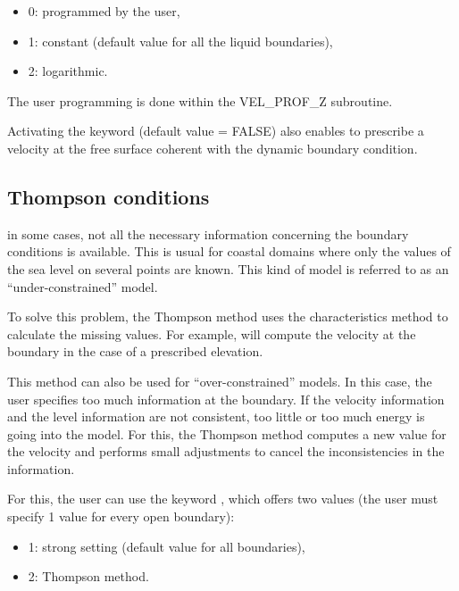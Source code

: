 \begin{itemize}
\item 0: programmed by the user,

\item 1: constant (default value for all the liquid boundaries),

\item 2: logarithmic.
\end{itemize}

The user programming is done within the VEL\_PROF\_Z subroutine.

Activating the keyword  (default value =
FALSE) also enables to prescribe a velocity at the free surface coherent with
the dynamic boundary condition.

\subsection{Thompson conditions}

in some cases, not all the necessary information concerning the boundary
conditions is available. This is usual for coastal domains where only the
values of the sea level on several points are known. This kind of model is
referred to as an ``under-constrained'' model.

To solve this problem, the Thompson method uses the characteristics method to
calculate the missing values. For example,  will compute the velocity
at the boundary in the case of a prescribed elevation.

This method can also be used for ``over-constrained'' models. In this case,
the user specifies too much information at the boundary. If the velocity
information and the level information are not consistent, too little or too
much energy is going into the model. For this, the Thompson method computes a
new value for the velocity and performs small adjustments to cancel the
inconsistencies in the information.

For this, the user can use the keyword ,
which offers two values (the user must specify 1 value for every open
boundary):

\begin{itemize}
\item 1: strong setting (default value for all boundaries),

\item 2: Thompson method.
\end{itemize}

